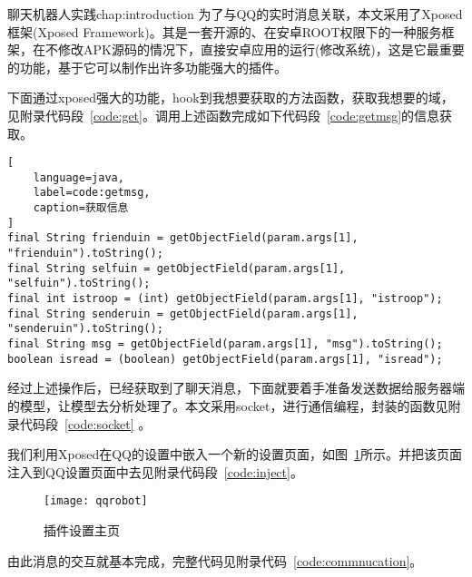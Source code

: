 \begin{cuzchapter}{聊天机器人实践}{chap:introduction}
为了与QQ的实时消息关联，本文采用了Xposed框架(Xposed Framework)。其是一套开源的、在安卓ROOT权限下的一种服务框架，在不修改APK源码的情况下，直接安卓应用的运行(修改系统)，这是它最重要的功能，基于它可以制作出许多功能强大的插件。

下面通过xposed强大的功能，hook到我想要获取的方法函数，获取我想要的域，见附录代码段~\ref{code:get}。调用上述函数完成如下代码段~\ref{code:getmsg}的信息获取。
\begin{lstlisting}[
    language=java,
    label=code:getmsg,
    caption=获取信息
]
final String frienduin = getObjectField(param.args[1], "frienduin").toString();
final String selfuin = getObjectField(param.args[1], "selfuin").toString();
final int istroop = (int) getObjectField(param.args[1], "istroop");
final String senderuin = getObjectField(param.args[1], "senderuin").toString();
final String msg = getObjectField(param.args[1], "msg").toString();
boolean isread = (boolean) getObjectField(param.args[1], "isread");
\end{lstlisting}

经过上述操作后，已经获取到了聊天消息，下面就要着手准备发送数据给服务器端的模型，让模型去分析处理了。本文采用socket，进行通信编程，封装的函数见附录代码段~\ref{code:socket} 。

我们利用Xposed在QQ的设置中嵌入一个新的设置页面，如图~\ref{qqrobot}所示。并把该页面注入到QQ设置页面中去见附录代码段~\ref{code:inject}。
\begin{figure}[!htbp]
    \centering
    \texttt{[image: qqrobot]}
    \caption[qqrobot]{插件设置主页}
    \label{qqrobot}
\end{figure}

由此消息的交互就基本完成，完整代码见附录代码~\ref{code:commnucation}。
\end{cuzchapter}
